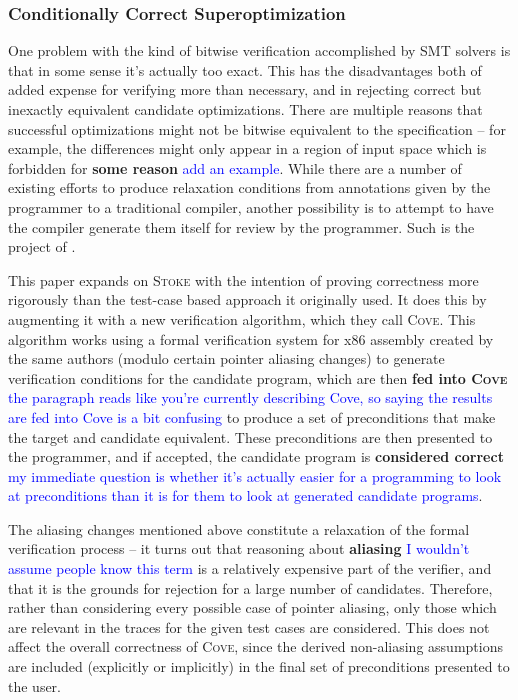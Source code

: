 \documentclass[12pt,twoside]{reedthesis}
\newcommand{\comment}[2]{\textbf{#1} \textcolor{blue}{#2}}
\begin{document}
    \subsubsection{Conditionally Correct Superoptimization}
        One problem with the kind of bitwise verification accomplished by SMT solvers is that in some sense it's actually too exact.
        This has the disadvantages both of added expense for verifying more than necessary, and in rejecting correct but inexactly equivalent candidate optimizations.
        There are multiple reasons that successful optimizations might not be bitwise equivalent to the specification
            -- for example, the differences might only appear in a region of input space which is forbidden for \comment{some reason}{add an example}.
        While there are a number of existing efforts to produce relaxation conditions from annotations given by the programmer to a traditional compiler, another possibility is to attempt to have the compiler generate them itself for review by the programmer.
        Such is the project of \cite{sharma2015conditionally}.
            
        This paper expands on \textsc{Stoke} with the intention of proving correctness more rigorously than the test-case based approach it originally used.
        It does this by augmenting it with a new verification algorithm, which they call \textsc{Cove}.
        This algorithm works using a formal verification system for x86 assembly created by the same authors \cite{sharma2013ddec} (modulo certain pointer aliasing changes) to generate verification conditions for the candidate program, which are then
            \comment{fed into \textsc{Cove}}{the paragraph reads like you're currently describing Cove, so saying the results are fed into Cove is a bit confusing}
            to produce a set of preconditions that make the target and candidate equivalent.
        These preconditions are then presented to the programmer, and if accepted, the candidate program is
            \comment{considered correct}{my immediate question is whether it's actually easier for a programming to look at preconditions than it is for them to look at generated candidate programs}.
            
        The aliasing changes mentioned above constitute a relaxation of the formal verification process -- it turns out that reasoning about
            \comment{aliasing}{I wouldn't assume people know this term}
            is a relatively expensive part of the verifier, and that it is the grounds for rejection for a large number of candidates.
        Therefore, rather than considering every possible case of pointer aliasing, only those which are relevant in the traces for the given test cases are considered.
        This does not affect the overall correctness of \textsc{Cove}, since the derived non-aliasing assumptions are included (explicitly or implicitly) in the final set of preconditions presented to the user.
            
\end{document}
